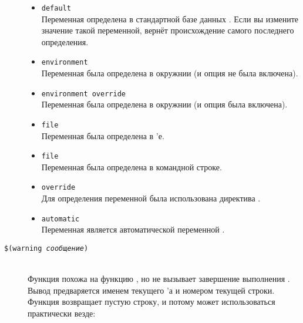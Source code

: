 \begin{description}
\begin{itemize}
\item \texttt{default} \hfill \\
Переменная определена в стандартной базе данных \GNUmake{}. Если вы
измените значение такой переменной,  вернёт
происхождение самого последнего определения.

\item \texttt{environment} \hfill \\
Переменная была определена в окружнии (и опция
 не была включена).

\item \texttt{environment override} \hfill \\
Переменная была определена в окружнии (и опция
 была включена).

\item \texttt{file} \hfill \\
Переменная была определена в \Makefile{}'е.

\item \texttt{file} \hfill \\
Переменная была определена в командной строке.

\item \texttt{override} \hfill \\
Для определения переменной была использована директива
.

\item \texttt{automatic} \hfill \\ Переменная является автоматической
переменной \GNUmake{}.
\end{itemize}

\item[\texttt{\${}(warning \emph{сообщение})}] \hfill \\
Функция  похожа на функцию , но не
вызывает завершение выполнения \GNUmake{}.  Вывод
 предваряется именем текущего \Makefile{}'а и
номером текущей строки. Функция  возвращает пустую
строку, и потому может использоваться практически везде:


\end{description}
